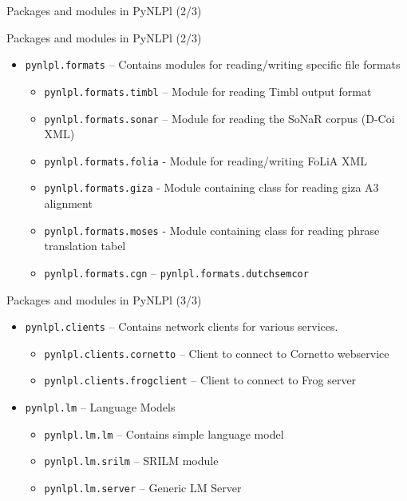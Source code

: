 \documentclass[compress]{beamer}
\begin{document}
\begin{frame}{Packages and modules in PyNLPl (2/3)}
    \begin{block}{Packages and modules in PyNLPl (2/3)}
        \begin{itemize}
            \item \texttt{pynlpl.formats} -- Contains modules for reading/writing specific file formats
            \begin{itemize}
                \item \texttt{pynlpl.formats.timbl} -- Module for reading Timbl output format
                \item \texttt{pynlpl.formats.sonar} -- Module for reading the SoNaR corpus (D-Coi XML)
                \item \texttt{pynlpl.formats.folia} - Module for reading/writing FoLiA XML
                \item \texttt{pynlpl.formats.giza} - Module containing class for reading giza A3 alignment
                \item \texttt{pynlpl.formats.moses} - Module containing class for reading phrase translation tabel                
                \item \texttt{pynlpl.formats.cgn} -- \texttt{pynlpl.formats.dutchsemcor}
            \end{itemize}
        \end{itemize}
    \end{block}

\end{frame}
    
\begin{frame}
    \begin{block}{Packages and modules in PyNLPl (3/3)}
        \begin{itemize}
            \item \texttt{pynlpl.clients} -- Contains network clients for various services.
            \begin{itemize}
                \item \texttt{pynlpl.clients.cornetto} -- Client to connect to Cornetto webservice
                \item \texttt{pynlpl.clients.frogclient} -- Client to connect to Frog server
            \end{itemize}
            \item \texttt{pynlpl.lm} -- Language Models
            \begin{itemize}
                \item \texttt{pynlpl.lm.lm} -- Contains simple language model
                \item \texttt{pynlpl.lm.srilm} -- SRILM module
                \item \texttt{pynlpl.lm.server} -- Generic LM Server
            \end{itemize}
        \end{itemize}
    \end{block}

\end{frame}
    
\end{document}
